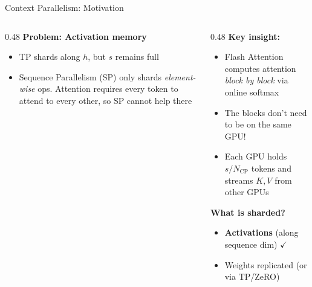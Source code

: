 \begin{frame}{Context Parallelism: Motivation}
  \vspace{0.1em}
  \begin{columns}
    \begin{column}{0.48\textwidth}
      \textbf{Problem: Activation memory}
      \begin{itemize}
        \item TP shards along $h$, but $s$ remains full
        \item Sequence Parallelism (SP) only shards \emph{element-wise} ops. Attention requires every token to attend to every other, so SP cannot help there
      \end{itemize}
    \end{column}
    \begin{column}{0.48\textwidth}
      \textbf{Key insight:}
      \begin{itemize}
        \item Flash Attention computes attention \emph{block by block} via online softmax
        \item The blocks don't need to be on the same GPU!
        \item Each GPU holds $s / N_{\text{CP}}$ tokens and streams $K,V$ from other GPUs
      \end{itemize}

      \vspace{0.3em}
      \textbf{What is sharded?}
      \begin{itemize}
        \item \textbf{Activations} (along sequence dim) $\checkmark$
        \item Weights replicated (or via TP/ZeRO)
      \end{itemize}
    \end{column}
  \end{columns}
\end{frame}

